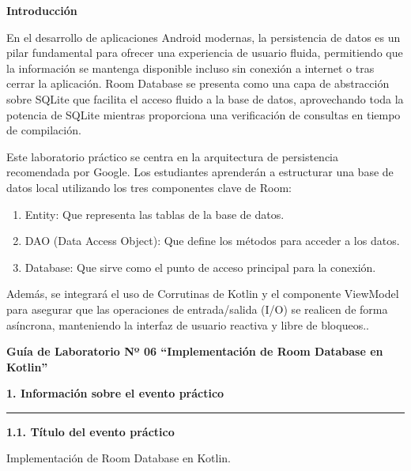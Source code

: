 \documentclass[10pt,letterpaper]{article}
\newcommand{\ruledheading}[1]{\par\vspace{0.2em}
\noindent\textbf{#1}\par
\noindent\rule{\linewidth}{0.45pt}\par}
\begin{document}
\newpage
\begin{center}
\vspace*{0.62in}
{\large\bfseries Introducción\par}
\end{center}
\vspace{0.13in}
En el desarrollo de aplicaciones Android modernas, la persistencia de datos es un pilar fundamental para ofrecer una experiencia de usuario fluida, permitiendo que la información se mantenga disponible incluso sin conexión a internet o tras cerrar la aplicación. Room Database se presenta como una capa de abstracción sobre SQLite que facilita el acceso fluido a la base de datos, aprovechando toda la potencia de SQLite mientras proporciona una verificación de consultas en tiempo de compilación.

Este laboratorio práctico se centra en la arquitectura de persistencia recomendada por Google. Los estudiantes aprenderán a estructurar una base de datos local utilizando los tres componentes clave de Room:

\begin{enumerate}
  \item Entity: Que representa las tablas de la base de datos.
  \item DAO (Data Access Object): Que define los métodos para acceder a los datos.
  \item Database: Que sirve como el punto de acceso principal para la conexión.
\end{enumerate}

Además, se integrará el uso de Corrutinas de Kotlin y el componente ViewModel para asegurar que las operaciones de entrada/salida (I/O) se realicen de forma asíncrona, manteniendo la interfaz de usuario reactiva y libre de bloqueos..


\newpage
\begin{center}
\vspace*{0.12in}
{\bfseries Guía de Laboratorio Nº 06 “Implementación de Room Database en Kotlin”\par}
\end{center}
\vspace{0.08in}
\ruledheading{1. Información sobre el evento práctico}

\textbf{1.1. \quad Título del evento práctico}

\hspace*{1.55em}Implementación de Room Database en Kotlin.
\end{document}
